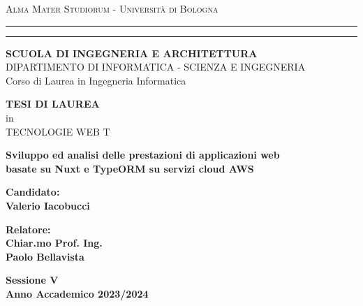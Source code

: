 \documentclass[11pt,a4paper]{report}
\begin{document}
\begin{titlepage}
	\begin{center}
	{{\Large{\textsc{Alma Mater Studiorum - Universit\`a di
	Bologna}}}} \rule[0.1cm]{15.8cm}{0.1mm}
	\rule[0.5cm]{15.8cm}{0.6mm}
	{\small{\bf SCUOLA DI INGEGNERIA E ARCHITETTURA}\\
	DIPARTIMENTO DI INFORMATICA - SCIENZA E INGEGNERIA\\
	Corso di Laurea in Ingegneria Informatica}
	\end{center}
	\vspace{15mm}
	\begin{center}
	{\large{\bf TESI DI LAUREA}}\\
	\vspace{2mm}
	{\large{in}}\\
	\vspace{2mm}
	{\large{TECNOLOGIE WEB T}}\\
	\end{center}
	\vspace{15mm}
	\begin{center}
	{\LARGE{\bf Sviluppo ed analisi delle prestazioni di applicazioni web}}\\
	\vspace{3mm}
	{\LARGE{\bf basate su Nuxt e TypeORM su servizi cloud AWS}}\\
	\end{center}
	\vspace{40mm}
	\par
	\noindent
	\begin{minipage}[t]{0.47\textwidth}
	{\large{\bf Candidato:\\
	Valerio Iacobucci}}
	\end{minipage}
	\hfill
	\begin{minipage}[t]{0.47\textwidth}\raggedleft
	{\large{\bf Relatore:\\
	Chiar.mo Prof. Ing.\\
	Paolo Bellavista}}
	\end{minipage}
	\vspace{20mm}
	\begin{center}
	{\large{\bf Sessione V\\
	Anno Accademico 2023/2024 }}
	\end{center}
\end{titlepage}

\shipout\null

\begingroup
	\hypersetup{linkcolor=black}
	\tableofcontents
\endgroup

\newpage
\end{document}
